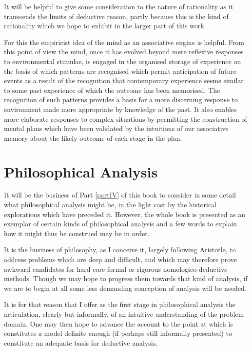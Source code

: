 It will be helpful to give some consideration to the nature of rationality as it transcends the limits of deductive reason, partly because this is the kind of rationality which we hope to exhibit in the larger part of this work.

For this the empiricist idea of the mind as an associative engine is helpful.
From this point of view the mind, once it has evolved beyond mere reflexive responses to environmental stimulae, is engaged in the organised storage of experience on the basis of which patterns are recognised which permit anticipation of future events as a result of the recognition that contemporary experience seems similar to some past experience of which the outcome has been memorised.
The recognition of such patterns provides a basis for a more discerning response to environment made more appropriate by knowledge of the past.
It also enables more elaborate responses to complex situations by permitting the construction of mental plans which have been validated by the intuitions of our associative memory about the likely outcome of each stage in the plan.


\section{Philosophical Analysis}

It will be the business of Part \ref{partIV} of this book to consider in some detail what philosophical analysis might be, in the light cast by the historical explorations which have preceded it.
However, the whole book is presented as an exemplar of certain kinds of philosophical analysis and a few words to explain how it might thus be construed may be in order.

It is the business of philosophy, as I conceive it, largely following Aristotle, to address problems which are deep and difficult, and which may therefore prove awkward candidates for hard core formal or rigorous nomologico-deductive methods.
Though we may hope to progress them towards that kind of analysis, if we are to begin at all some less demanding conception of analysis will be needed.

It is for that reason that I offer as the first stage in philosophical analysis the articulation, clearly but informally, of an intuitive understanding of the problem domain.
One may then hope to advance the account to the point at which is constitutes a model definite enough (if perhaps still informally presented) to constitute an adequate basis for deductive analysis.

